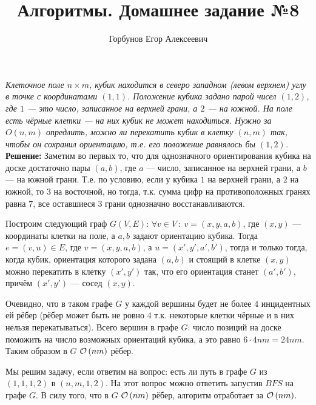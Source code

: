 
\title{Алгоритмы. Домашнее задание №8}
\author{Горбунов Егор Алексеевич}


\maketitle

\textit{Клеточное поле $n \times m$, кубик находится в северо западном (левом верхнем) углу в точке с координатами 
$(1,1)$. Положение кубика задано парой чисел $(1, 2)$, где $1$ --- это число, записанное на верхней грани, 
а $2$ --- на южной. На поле есть чёрные клетки --- на них кубик не может находиться. Нужно за $O(n,m)$ опредлить,
можно ли перекатить кубик в клетку $(n,m)$ так, чтобы он сохранил ориентацию, т.е. его положение равнялось бы $(1,2)$.}
\\
\textbf{Решение:} Заметим во первых то, что для однозначного ориентирования кубика на доске достаточно пары $(a,b)$, 
где $a$ --- число, записанное на верхней грани, а $b$ --- на южной грани. Т.е. по условию, если у кубика $1$ на верхней 
грани, а $2$ на южной, то $3$ на восточной, но тогда, т.к. сумма цифр на противоположных гранях равна $7$, все 
оставшиеся $3$ грани однозначно восстанавливаются.

Построим следующий граф $G(V,E)$: $\forall v \in V\ :\ v = (x,y,a,b)$, где $(x,y)$ --- координаты клетки на поле, а 
$a,b$ задают ориентацию кубика. Тогда $e=(v,u)\in E$, где $v = (x,y,a,b)$, а $u=(x',y',a',b')$, тогда и только тогда,
когда кубик, ориентация которого задана $(a,b)$ и стоящий в клетке $(x,y)$ можно перекатить в клетку $(x',y')$ так, что
его ориентация станет $(a',b')$, причём $(x',y')$ --- сосед $(x,y)$.

Очевидно, что в таком графе $G$ у каждой вершины будет не более $4$ инцидентных ей рёбер (рёбер может быть не ровно 4 т.к.
некоторые клетки чёрные и в них нельзя перекатываться). Всего вершин в графе $G$: число позиций на доске поможить на число
возможных ориентаций кубика, а это равно $6\cdot 4nm = 24nm$. Таким образом в $G$ $\mathcal{O}\left(nm\right)$ рёбер.

Мы решим задачу, если ответим на вопрос: есть ли путь в графе $G$ из $(1,1,1,2)$ в $(n,m,1,2)$. На этот вопрос можно ответить
запустив $BFS$ на графе $G$. В силу того, что в $G$ $\mathcal{O}\left(nm\right)$ рёбер, алгоритм отработает за $\mathcal{O}\left(nm\right)$. \xqed

